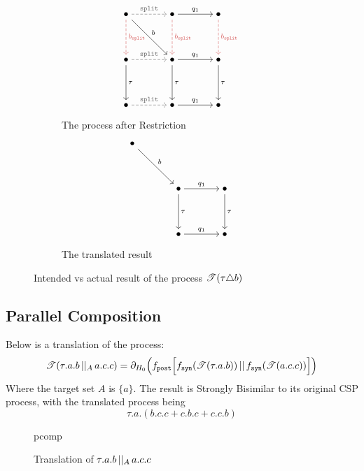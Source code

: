 \documentclass[../hons_project.tex]{subfiles}
\begin{document}
\begin{figure}[H]
	\centering
	\begin{subfigure}[b]{0.45\textwidth}
		\[\begin{tikzcd}[cramped, column sep=scriptsize]
				\bullet && \bullet && \bullet \\
				\\
				\bullet && \bullet && \bullet \\
				\\
				\bullet && \bullet && \bullet
				\arrow["{\mathtt{split}}", color={rgb,255:red,110;green,110;blue,110}, dashed, from=1-1, to=1-3]
				\arrow["{b_{\mathtt{split}}}", color={rgb,255:red,214;green,92;blue,92}, dashed, from=1-1, to=3-1]
				\arrow["b", from=1-1, to=3-3]
				\arrow["{q_1}", from=1-3, to=1-5]
				\arrow["{b_{\mathtt{split}}}", color={rgb,255:red,214;green,92;blue,92}, dashed, from=1-3, to=3-3]
				\arrow["{b_{\mathtt{split}}}", color={rgb,255:red,214;green,92;blue,92}, dashed, from=1-5, to=3-5]
				\arrow["{\mathtt{split}}", color={rgb,255:red,110;green,110;blue,110}, dashed, from=3-1, to=3-3]
				\arrow["\tau", from=3-1, to=5-1]
				\arrow["{q_1}", from=3-3, to=3-5]
				\arrow["\tau", from=3-3, to=5-3]
				\arrow["\tau", from=3-5, to=5-5]
				\arrow["{\mathtt{split}}", color={rgb,255:red,110;green,110;blue,110}, dashed, from=5-1, to=5-3]
				\arrow["{q_1}", from=5-3, to=5-5]
			\end{tikzcd}\]
		\caption{The process after Restriction}
	\end{subfigure}\hfill
	\begin{subfigure}[b]{0.45\textwidth}
		\[\begin{tikzcd}[cramped, column sep=scriptsize]
				\bullet \\
				\\
				&& \bullet && \bullet \\
				\\
				&& \bullet && \bullet
				\arrow["b", from=1-1, to=3-3]
				\arrow["{q_1}", from=3-3, to=3-5]
				\arrow["\tau", from=3-3, to=5-3]
				\arrow["\tau", from=3-5, to=5-5]
				\arrow["{q_1}", from=5-3, to=5-5]
			\end{tikzcd}\]
		\caption{The translated result}
	\end{subfigure}
	\caption{Intended vs actual result of the process $\mathscr{T}(\tau \triangle b)$}
\end{figure}

\newpage
\subsection{Parallel Composition}\label{ssec:diagrams-pcomp}
Below is a translation of the process:
\[\mathscr{T}(\tau.a.b \,\vert\vert_{A}\, a.c.c)     = \partial_{H_{0}}\Bigl(f_{\mathtt{post}}\Bigl[f_{\mathtt{syn}}(\mathscr{T}(\tau.a.b)) \,\vert\vert\, f_{\mathtt{syn}}(\mathscr{T}(a.c.c))\Bigr]\Bigr)\]
Where the target set $A$ is $\{a\}$.
The result is Strongly Bisimilar to its original CSP process, with the translated process being
\[\tau.a.(b.c.c+c.b.c+c.c.b)\]
\begin{figure}[h!]
	\centering
	{pcomp}
	\caption{Translation of $\tau.a.b \,\vert\vert_{A}\, a.c.c$}
\end{figure}


\end{document}
